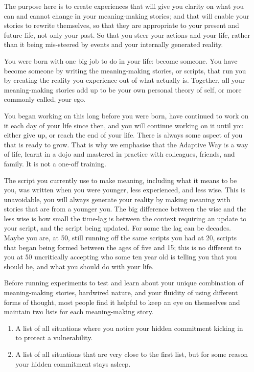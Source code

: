 The purpose here is to create experiences that will give you clarity on what you can and cannot change in your meaning-making stories; and that will enable your stories to rewrite themselves, so that they are appropriate to your present and future life, not only your past. So that you steer your actions and your life, rather than it being mis-steered by events and your internally generated reality.


You were born with one big job to do in your life: become someone. You have become someone by writing the meaning-making stories, or scripts, that run you by creating the reality you experience out of what actually is. Together, all your meaning-making stories add up to be your own personal theory of self, or more commonly called, your ego. 


You began working on this long before you were born, have continued to work on it each day of your life since then, and you will continue working on it until you either give up, or reach the end of your life. There is always some aspect of you that is ready to grow. That is why we emphasise that the Adaptive Way is a way of life, learnt in a dojo and mastered in practice with colleagues, friends, and family. It is not a one-off training.


The script you currently use to make meaning, including what it means to be you, was written when you were younger, less experienced, and less wise. This is unavoidable, you will always generate your reality by making meaning with stories that are from a younger you. The big difference between the wise and the less wise is how small the time-lag is between the context requiring an update to your script, and the script being updated. For some the lag can be decades. Maybe you are, at 50, still running off the same scripts you had at 20, scripts that began being formed between the ages of five and 15; this is no different to you at 50 uncritically accepting who some ten year old is telling you that you should be, and what you should do with your life.


Before running experiments to test and learn about your unique combination of meaning-making stories, hardwired nature, and your fluidity of using different forms of thought, most people find it helpful to keep an eye on themselves and maintain two lists for each meaning-making story.


\begin{enumerate}
\item A list of all situations where you notice your hidden commitment kicking in to protect a vulnerability.
\item A list of all situations that are very close to the first list, but for some reason your hidden commitment stays asleep.
\end{enumerate}


